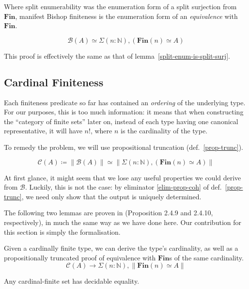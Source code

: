 Where split enumerability was the enumeration form of a split surjection from
\(\mathbf{Fin}\), manifest Bishop finiteness is the enumeration form of an
\emph{equivalence} with \(\mathbf{Fin}\).
\begin{romlemma} \label{bishop-equiv}
  \begin{equation}
    \mathcal{B}(A) \simeq \Sigma {(n : \mathbb{N})} , \left( \mathbf{Fin}(n) \simeq A \right)
  \end{equation}
\end{romlemma}
This proof is effectively the same as that of
lemma~\ref{split-enum-is-split-surj}.
\subsection{Cardinal Finiteness}
Each finiteness predicate so far has contained an \emph{ordering} of the
underlying type.
For our purposes, this is too much information: it means that when constructing
the ``category of finite sets'' later on, instead of each type having one
canonical representative, it will have \(n!\), where \(n\) is the cardinality of
the type\footnotemark.


To remedy the problem, we will use propositional truncation
(def.~\ref{prop-trunc}).
\begin{romdefinition}
  \begin{equation}
    \mathcal{C}(A) \coloneqq \lVert \mathcal{B}(A) \rVert \simeq \lVert \Sigma(n : \mathbb{N}) , (\mathbf{Fin}(n) \simeq A) \rVert
  \end{equation}
\end{romdefinition}
At first glance, it might seem that we lose any useful properties we could
derive from \(\mathcal{B}\).
Luckily, this is not the case: by eliminator \ref{elim-prop-coh} of
def.~\ref{prop-trunc}, we need only show that the output is uniquely determined.

The following two lemmas are proven in
\cite{yorgeyCombinatorialSpeciesLabelled2014} (Proposition 2.4.9 and 2.4.10,
respectively), in much the same way as we have done here.
Our contribution for this section is simply the formalisation.
\begin{romlemma}
  Given a cardinally finite type, we can derive the type's cardinality, as well
  as a propositionally truncated proof of equivalence with \(\textbf{Fin}\)s of
  the same cardinality.
  \begin{equation}
    \mathcal{C}(A) \rightarrow \Sigma {(n : \mathbb{N})} , \lVert \textbf{Fin}(n) \simeq A \rVert
  \end{equation}
\end{romlemma}
\begin{romlemma} \label{cardinal-finite-discrete}
  Any cardinal-finite set has decidable equality.
\end{romlemma}
